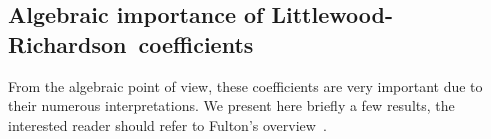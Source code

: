 \documentclass[12pt,a4paper]{article}
\newcommand{\LR}{Littlewood-Richardson\ }
\begin{document}

\subsection{Algebraic importance of \LR coefficients}

From the algebraic point of view, these coefficients are very important due to
their numerous interpretations. We present here briefly a few results, the
interested reader should refer to Fulton's overview~\cite{Fulton}.
\end{document}
